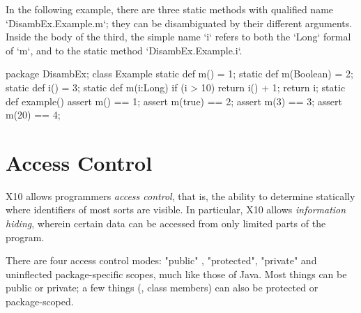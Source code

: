 \begin{ex}
In the following example, there are three static methods with 
qualified name \xcd`DisambEx.Example.m`; they can be disambiguated by their
different arguments.   Inside the body of the third, the simple name \xcd`i`
refers to both the \xcd`Long` formal of \xcd`m`, and to the static method 
\xcd`DisambEx.Example.i`.  
\begin{xten}
package DisambEx; 
class Example {
  static def m() = 1;
  static def m(Boolean) = 2;
  static def i() = 3;
  static def m(i:Long) {
    if (i > 10) {
      return i() + 1;
    }
    return i;
  }
  static def example() {
    assert m() == 1;
    assert m(true) == 2;
    assert m(3) == 3;
    assert m(20) == 4;
  }
}
\end{xten}
\end{ex}



\section{Access Control}

X10 allows programmers {\em access control}, that is, the ability to determine
statically where identifiers of most sorts are visible.  In particular, X10
allows {\em information hiding}, wherein certain data can be accessed from
only limited parts of the program. 

There are four access control modes: 
\xcd"public" , \xcd"protected", \xcd"private"
and uninflected package-specific scopes, much like those of Java. 
Most things can be public or private; a few things (\eg, class members) can
also be protected or package-scoped.  

